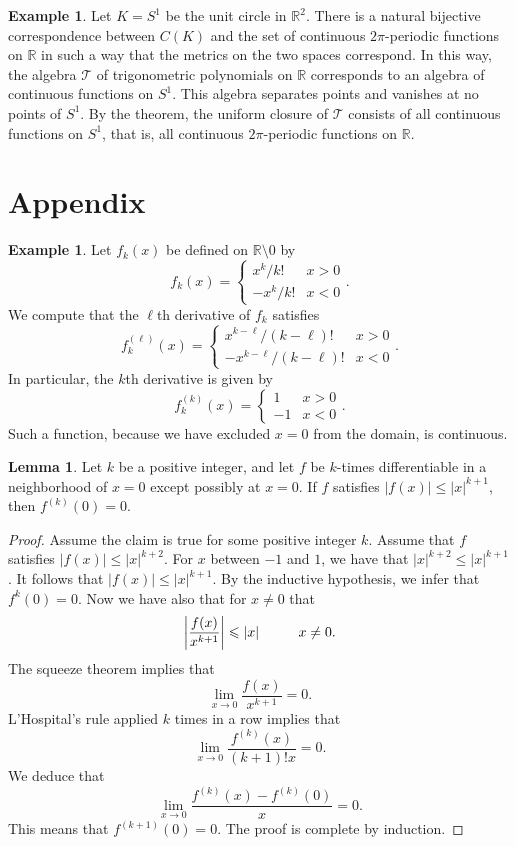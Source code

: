 \documentclass[12pt]{article}
\theoremstyle{definition}
\newtheorem{example}[definition]{Example}
\theoremstyle{theorem}
\newtheorem{lemma}[definition]{Lemma}
\begin{document}
\begin{example}
Let $K = S^1$ be the unit circle in $\mathbb{R}^2$. There is a natural bijective correspondence between $C(K)$ and the set of continuous $2\pi$-periodic functions on $\mathbb{R}$ in such a way that the metrics on the two spaces correspond. In this way, the algebra $\mathcal{T}$ of trigonometric polynomials on $\mathbb{R}$ corresponds to an algebra of continuous functions on $S^1$. This algebra separates points and vanishes at no points of $S^1$. By the theorem, the uniform closure of $\mathcal{T}$ consists of all continuous functions on $S^1$, that is, all continuous $2\pi$-periodic functions on $\mathbb{R}$. 
\end{example}



\section{Appendix}


\begin{example}
Let $f_k(x)$ be defined on $\mathbb{R}\setminus 0$ by 
\[
f_k(x) = \begin{cases}
x^k/k! & x > 0 \\
-x^k/k! & x < 0
\end{cases}.
\]
We compute that the $\ell$th derivative of $f_k$ satisfies 
\[
f_k^{(\ell)}(x) = \begin{cases}
x^{k - \ell}/(k - \ell)! & x > 0\\
-x^{k-\ell}/(k - \ell)! & x < 0
\end{cases}.
\]
In particular, the $k$th derivative is given by 
\[
f_k^{(k)}(x) = \begin{cases}
1 & x > 0 \\
-1 & x < 0
\end{cases}.
\]
Such a function, because we have excluded $x = 0$ from the domain, is continuous. 
\end{example}

\begin{lemma}
Let $k$ be a positive integer, and let $f$ be $k$-times differentiable in a neighborhood of $x = 0$ except possibly at $x = 0$. If $f$ satisfies $|f(x)| \leqslant |x|^{k+1}$, then $f^{(k)}(0) = 0$. 
\end{lemma}

\begin{proof}
Assume the claim is true for some positive integer $k$. Assume that $f$ satisfies $|f(x)| \leqslant |x|^{k+2}$. For $x$ between $-1$ and $1$, we have that $|x|^{k+2} \leqslant |x|^{k+1}$. It follows that $|f(x)| \leqslant |x|^{k+1}$. By the inductive hypothesis, we infer that $f^{k}(0) = 0$. Now we have also that for $x \ne 0$ that 
\[
\left|\frac{f(x)}{x^{k+1}}\right| \leqslant |x| \hspace{10mm} x \ne 0.
\]
The squeeze theorem implies that 
\[
\lim_{x \to 0}\frac{f(x)}{x^{k+1}} = 0.
\]
L'Hospital's rule applied $k$ times in a row implies that 
\[
\lim_{x \to 0} \frac{f^{(k)}(x)}{(k+1)!x} = 0.
\]
We deduce that 
\[
\lim_{x \to 0} \frac{f^{(k)}(x) - f^{(k)}(0)}{x} = 0.
\]
This means that $f^{(k+1)}(0) = 0$. The proof is complete by induction. 
\end{proof}
\end{document}

